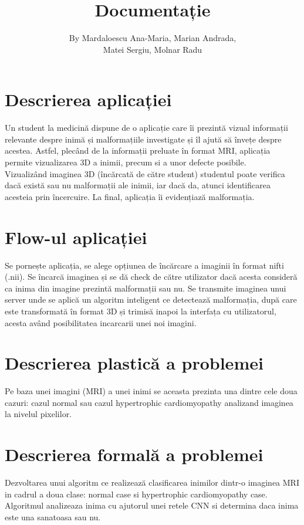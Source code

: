\documentclass[a4papaer,12pt]{article}
\begin{document}
\title{\Huge{\textbf{Documentație}}}
\author{By Mardaloescu Ana-Maria, Marian Andrada, \\ Matei Sergiu, Molnar Radu}
\date{}
\maketitle

\newpage

\tableofcontents
{}

\newpage

\section{Descrierea aplicației}
Un student la medicină dispune de o aplicație care îi prezintă vizual informații relevante despre inimă și malformațiile investigate și îl ajută să învețe despre acestea. Astfel, plecând de la informații preluate în format MRI, aplicația permite vizualizarea 3D a inimii, precum si a unor defecte posibile. 
\\
\indent Vizualizând imaginea 3D (încărcată de către student) studentul poate verifica dacă există sau nu malformații ale inimii, iar dacă da, atunci identificarea acesteia prin încercuire. La final, aplicația îi evidențiază malformația.

\section{Flow-ul aplicației}
Se pornește aplicația, se alege opțiunea de încărcare a imaginii în format nifti (.nii). Se încarcă imaginea și se dă check de către utilizator dacă acesta consideră ca inima din imagine prezintă malformații sau nu. Se transmite imaginea unui server unde se aplică un algoritm inteligent ce detectează malformația, după care este transformată în format 3D și trimisă inapoi la interfața cu utilizatorul, acesta având posibilitatea incarcarii unei noi imagini.

\section{Descrierea plastică a problemei}
Pe baza unei imagini (MRI) a unei inimi se aceasta prezinta una dintre cele doua cazuri: cazul normal sau cazul hypertrophic cardiomyopathy analizand imaginea la nivelul pixelilor.


\section{Descrierea formală a problemei}
Dezvoltarea unui algoritm ce realizează clasificarea inimilor dintr-o imaginea MRI in cadrul a doua clase: normal case si hypertrophic cardiomyopathy case. \\
\indent Algoritmul analizeaza inima cu ajutorul unei retele CNN si determina daca inima este una sanatoasa sau nu.
\end{document}
